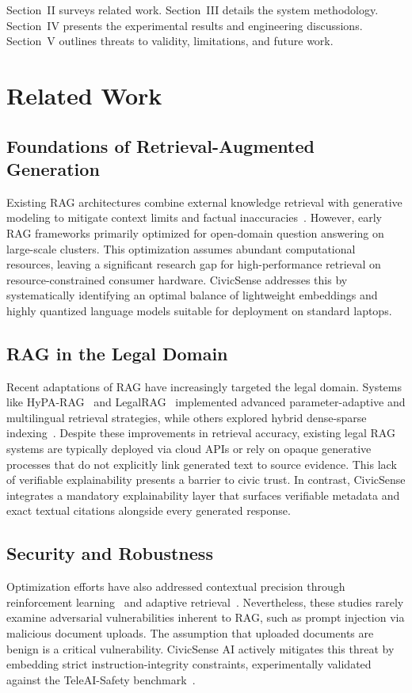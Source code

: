 \documentclass[conference]{IEEEtran}
\begin{document}
Section~II surveys related work. Section~III details the system methodology. Section~IV presents the experimental results and engineering discussions. Section~V outlines threats to validity, limitations, and future work.

\section{Related Work}

\subsection{Foundations of Retrieval-Augmented Generation}
Existing RAG architectures combine external knowledge retrieval with generative modeling to mitigate context limits and factual inaccuracies~\cite{b1,b2,b6}. However, early RAG frameworks primarily optimized for open-domain question answering on large-scale clusters. This optimization assumes abundant computational resources, leaving a significant research gap for high-performance retrieval on resource-constrained consumer hardware. CivicSense addresses this by systematically identifying an optimal balance of lightweight embeddings and highly quantized language models suitable for deployment on standard laptops.

\subsection{RAG in the Legal Domain}
Recent adaptations of RAG have increasingly targeted the legal domain. Systems like HyPA-RAG~\cite{b3} and LegalRAG~\cite{b10} implemented advanced parameter-adaptive and multilingual retrieval strategies, while others explored hybrid dense-sparse indexing~\cite{b9}. Despite these improvements in retrieval accuracy, existing legal RAG systems are typically deployed via cloud APIs or rely on opaque generative processes that do not explicitly link generated text to source evidence. This lack of verifiable explainability presents a barrier to civic trust. In contrast, CivicSense integrates a mandatory explainability layer that surfaces verifiable metadata and exact textual citations alongside every generated response.

\subsection{Security and Robustness}
Optimization efforts have also addressed contextual precision through reinforcement learning~\cite{b17} and adaptive retrieval~\cite{b22,b23}. Nevertheless, these studies rarely examine adversarial vulnerabilities inherent to RAG, such as prompt injection via malicious document uploads. The assumption that uploaded documents are benign is a critical vulnerability. CivicSense AI actively mitigates this threat by embedding strict instruction-integrity constraints, experimentally validated against the TeleAI-Safety benchmark~\cite{b24}.
\end{document}
